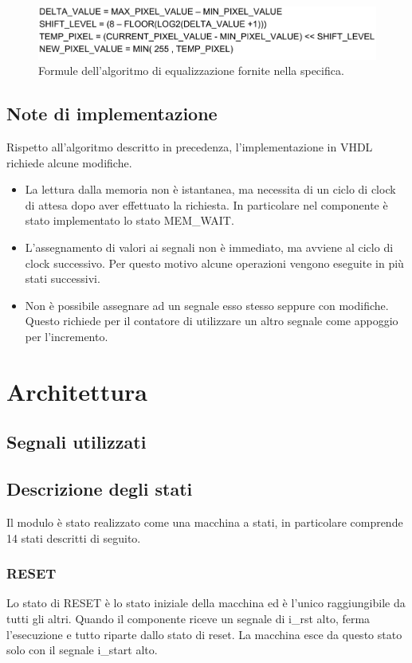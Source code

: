 \documentclass{article}
\begin{document}
\begin{figure}[h]
    \includegraphics[width=\textwidth]{formulas.png}
    \centering
    \caption{Formule dell'algoritmo di equalizzazione fornite nella specifica.}
\end{figure}

\subsection{Note di implementazione}
Rispetto all'algoritmo descritto in precedenza, l'implementazione in VHDL richiede alcune modifiche.
\begin{itemize}
    \item La lettura dalla memoria non è istantanea, ma necessita di un ciclo di clock di attesa dopo aver effettuato la richiesta. In particolare nel componente è stato implementato lo stato MEM\_WAIT.
    \item L'assegnamento di valori ai segnali non è immediato, ma avviene al ciclo di clock successivo. Per questo motivo alcune operazioni vengono eseguite in più stati successivi.
    \item Non è possibile assegnare ad un segnale esso stesso seppure con modifiche. Questo richiede per il contatore di utilizzare un altro segnale come appoggio per l'incremento.
\end{itemize}

\pagebreak
\section{Architettura}

\subsection{Segnali utilizzati}

\pagebreak
\subsection{Descrizione degli stati}
Il modulo è stato realizzato come una macchina a stati, in particolare comprende 14 stati descritti di seguito.

\subsubsection{RESET}
Lo stato di RESET è lo stato iniziale della macchina ed è l'unico raggiungibile da tutti gli altri. Quando il componente riceve un segnale di i\_rst alto, ferma l'esecuzione e tutto riparte dallo stato di reset. La macchina esce da questo stato solo con il segnale i\_start alto.
\end{document}
